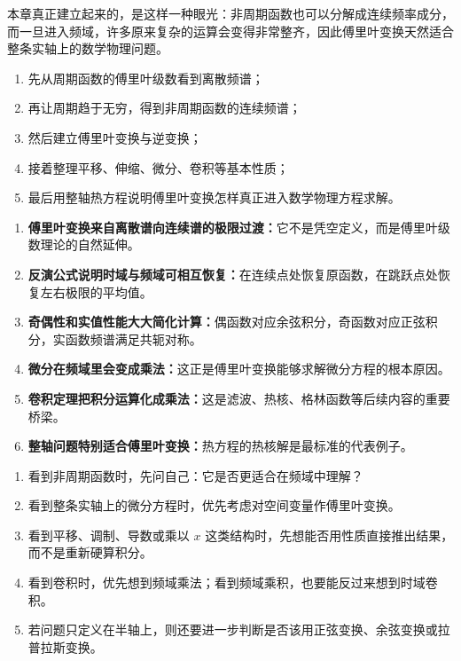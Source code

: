 \begin{wulibj}[一句话回看本章]
本章真正建立起来的，是这样一种眼光：非周期函数也可以分解成连续频率成分，而一旦进入频域，许多原来复杂的运算会变得非常整齐，因此傅里叶变换天然适合整条实轴上的数学物理问题。
\end{wulibj}

\begin{tishi}[知识主线]
\begin{enumerate}
    \item 先从周期函数的傅里叶级数看到离散频谱；
    \item 再让周期趋于无穷，得到非周期函数的连续频谱；
    \item 然后建立傅里叶变换与逆变换；
    \item 接着整理平移、伸缩、微分、卷积等基本性质；
    \item 最后用整轴热方程说明傅里叶变换怎样真正进入数学物理方程求解。
\end{enumerate}
\end{tishi}

\begin{zhongyao}[本章主要结论]
\raggedright
\begin{enumerate}
    \item \textbf{傅里叶变换来自离散谱向连续谱的极限过渡：}它不是凭空定义，而是傅里叶级数理论的自然延伸。
    \item \textbf{反演公式说明时域与频域可相互恢复：}在连续点处恢复原函数，在跳跃点处恢复左右极限的平均值。
    \item \textbf{奇偶性和实值性能大大简化计算：}偶函数对应余弦积分，奇函数对应正弦积分，实函数频谱满足共轭对称。
    \item \textbf{微分在频域里会变成乘法：}这正是傅里叶变换能够求解微分方程的根本原因。
    \item \textbf{卷积定理把积分运算化成乘法：}这是滤波、热核、格林函数等后续内容的重要桥梁。
    \item \textbf{整轴问题特别适合傅里叶变换：}热方程的热核解是最标准的代表例子。
\end{enumerate}
\end{zhongyao}

\begin{tishi}[做题时的判断思路]
\begin{enumerate}
    \item 看到非周期函数时，先问自己：它是否更适合在频域中理解？
    \item 看到整条实轴上的微分方程时，优先考虑对空间变量作傅里叶变换。
    \item 看到平移、调制、导数或乘以 $x$ 这类结构时，先想能否用性质直接推出结果，而不是重新硬算积分。
    \item 看到卷积时，优先想到频域乘法；看到频域乘积，也要能反过来想到时域卷积。
    \item 若问题只定义在半轴上，则还要进一步判断是否该用正弦变换、余弦变换或拉普拉斯变换。
\end{enumerate}
\end{tishi}

